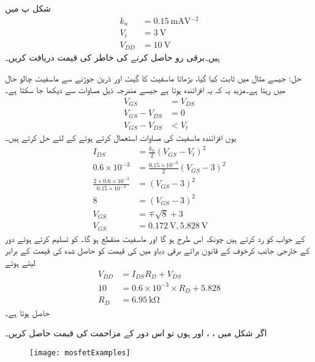 
شکل  پ میں
\begin{align*}
k_n&=\SI{0.15}{\milli \ampere \volt^{-2}}\\
V_t&=\SI{3}{\volt}\\
V_{DD}&=\SI{10}{\volt}
\end{align*}
ہیں۔برقی رو  حاصل کرنے کی خاطر   کی قیمت دریافت کریں۔

حل:	جیسے مثال   میں ثابت کیا گیا، بڑھاتا  ماسفیٹ کا گیٹ اور ڈرین جوڑنے سے ماسفیٹ چالو حال میں رہتا ہے۔مزید یہ کہ یہ افزائندہ  ہوتا ہے جیسے مندرجہ ذیل مساوات سے دیکھا جا سکتا ہے۔
\begin{align*}
V_{GS}&=V_{DS}\\
V_{GS}-V_{DS}&=0\\
V_{GS}-V_{DS}&<V_t
\end{align*}
یوں افزائندہ ماسفیٹ کی مساوات استعمال کرتے ہوئے   کے لئے حل کرتے ہیں۔
\begin{align*}
I_{DS}&=\frac{k_n}{2}\left(V_{GS}-V_t \right )^2 \\
0.6 \times 10^{-3}&=\frac{0.15 \times 10^{-3}}{2} \left(V_{GS}-3 \right )^{2}\\
\frac{2 \times 0.6 \times 10^{-3}}{0.15 \times 10^{-3}}&=\left(V_{GS}-3 \right )^2 \\
8&=\left(V_{GS}-3 \right )^2 \\ 
V_{GS}&=\mp \sqrt{8} +3\\
V_{GS}&=\SI{0.172}{\volt}, \SI{5.828}{\volt}
\end{align*}
 کے جواب کو رد کرتے ہیں چونکہ اس طرح   ہو گا اور ماسفیٹ منقطع ہو گا۔  کو تسلیم کرتے ہوئے دور کے خارجی جانب کرخوف کے قانون برائے برقی دباو میں  کی قیمت کو حاصل شدہ   کی قیمت کے برابر لیتے ہوئے
\begin{align*}
V_{DD}&=I_{DS}R_{D} +V_{DS}\\
10&=0.6 \times 10^{-3} \times R_{D}+5.828\\
R_{D}&=\SI{6.95}{\kilo \ohm}
\end{align*}
حاصل ہوتا ہے۔


اگر شکل  میں  ، ،  اور  ہوں تو اس دور کے مزاحمت کی قیمت حاصل کریں۔
\begin{figure}
\centering
\texttt{[image: mosfetExamples]}
\caption{}
\label{شکل_ماسفیٹ_کے_یک_سمتی_ادوار_مثالیں}
\end{figure}

